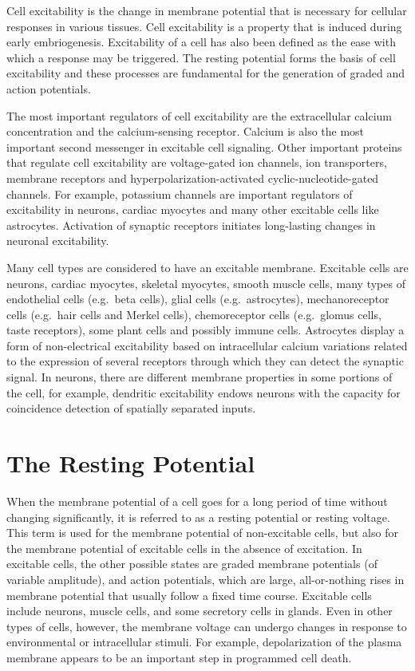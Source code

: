 Cell excitability is the change in membrane potential that is necessary for cellular responses in various tissues. Cell excitability is a property that is induced during early embriogenesis. Excitability of a cell has also been defined as the ease with which a response may be triggered. The resting potential forms the basis of cell excitability and these processes are fundamental for the generation of graded and action potentials.

The most important regulators of cell excitability are the extracellular calcium concentration and the calcium-sensing receptor. Calcium is also the most important second messenger in excitable cell signaling. Other important proteins that regulate cell excitability are voltage-gated ion channels, ion transporters, membrane receptors and hyperpolarization-activated cyclic-nucleotide-gated channels. For example, potassium channels are important regulators of excitability in neurons, cardiac myocytes and many other excitable cells like astrocytes. Activation of synaptic receptors initiates long-lasting changes in neuronal excitability.

Many cell types are considered to have an excitable membrane. Excitable cells are neurons, cardiac myocytes, skeletal myocytes, smooth muscle cells, many types of endothelial cells (e.g.~beta cells), glial cells (e.g.~astrocytes), mechanoreceptor cells (e.g.~hair cells and Merkel cells), chemoreceptor cells (e.g.~glomus cells, taste receptors), some plant cells and possibly immune cells. Astrocytes display a form of non-electrical excitability based on intracellular calcium variations related to the expression of several receptors through which they can detect the synaptic signal. In neurons, there are different membrane properties in some portions of the cell, for example, dendritic excitability endows neurons with the capacity for coincidence detection of spatially separated inputs.

\hypertarget{the-resting-potential}{%
\section{The Resting Potential}\label{the-resting-potential}}

When the membrane potential of a cell goes for a long period of time without changing significantly, it is referred to as a resting potential or resting voltage. This term is used for the membrane potential of non-excitable cells, but also for the membrane potential of excitable cells in the absence of excitation. In excitable cells, the other possible states are graded membrane potentials (of variable amplitude), and action potentials, which are large, all-or-nothing rises in membrane potential that usually follow a fixed time course. Excitable cells include neurons, muscle cells, and some secretory cells in glands. Even in other types of cells, however, the membrane voltage can undergo changes in response to environmental or intracellular stimuli. For example, depolarization of the plasma membrane appears to be an important step in programmed cell death.

